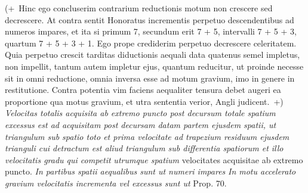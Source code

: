 (+~Hinc ego concluserim contrarium reductionis motum non crescere sed decrescere. At contra sentit Honoratus\protect{}  incrementis perpetuo descendentibus ad numeros impares, et ita si primum 7, secundum erit 7 + 5,  intervalli 7 + 5 + 3, quartum 7 + 5 + 3 + 1. Ego prope crediderim perpetuo decrescere  celeritatem\protect{}. Quia perpetuo crescit tarditas diductionis aequali data   quatenus semel impletus, non impellit, tantum autem impletur ejus, quantum reducitur, ut proinde necesse sit in omni reductione, omnia inversa esse ad motum gravium, imo in genere in restitutione. Contra potentia vim faciens aequaliter tensura debet augeri ea proportione qua motus gravium, et utra sententia verior, Angli judicent.~+)
\pend 
\pstart {}
\textit{Velocitas totalis acquisita\protect{} ab extremo puncto post decursum totale spatium excessus est ad acquisitam post decursam datam partem ejusdem spatii, ut triangulum sub spatio toto et prima velocitate\protect{} ad trapezium residuum ejusdem trianguli cui detractum est aliud triangulum sub differentia spatiorum et illo velocitatis gradu\protect{} qui competit} 
\textit{utrumque spatium } velocitates acquisitae\protect{} ab extremo puncto.
\pend 
\pstart {}
\textit{In partibus spatii aequalibus sunt ut numeri impares } 
\textit{In motu accelerato\protect{} gravium velocitatis incrementa\protect{} vel excessus sunt ut } Prop. 70.
